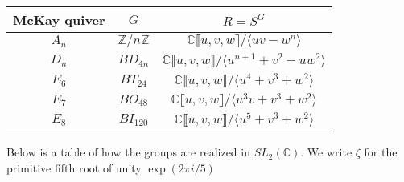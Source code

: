 \documentclass[11pt, a4paper, english]{article}
\numberwithin{prop}{section}
\numberwithin{lemma}{section}
\numberwithin{theorem}{section}
\numberwithin{defin}{section}
\numberwithin{example}{section}
\newcommand{\C}{\mathbb{C}}
\begin{document}
\begin{center}
{\renewcommand{\arraystretch}{1.6}
\begin{tabular}{|c|c|c|}
\hline
McKay quiver & $G$ & $R = S^G$\\
\hline\hline
$A_n$ & $\mathbb{Z}/n\mathbb{Z}$ & 
$\C \llbracket u, v, w \rrbracket/\langle uv - w^n \rangle$
\\
\hline
$D_n$ & $BD_{4n}$ & 
$\C \llbracket u, v, w \rrbracket/\langle u^{n+1} + v^2 - uw^2\rangle$
\\
\hline
$E_6$ & $BT_24$ & 
$\C \llbracket u, v, w \rrbracket/\langle u^4 + v^3 + w^2 \rangle$
\\
\hline
$E_7$ & $BO_{48}$ &
$\C \llbracket u, v, w \rrbracket/\langle u^3v + v^3 + w^2 \rangle$
\\
\hline
$E_8$ & $BI_{120}$ &
$\C \llbracket u, v, w \rrbracket/\langle u^5 + v^3 + w^2 \rangle$
\\
\hline
\end{tabular}
}
\end{center}

Below is a table of how the groups are realized in $SL_2(\C)$. We write $\zeta$ for the primitive fifth root of unity $\exp(2\pi i/5)$
\end{document}
